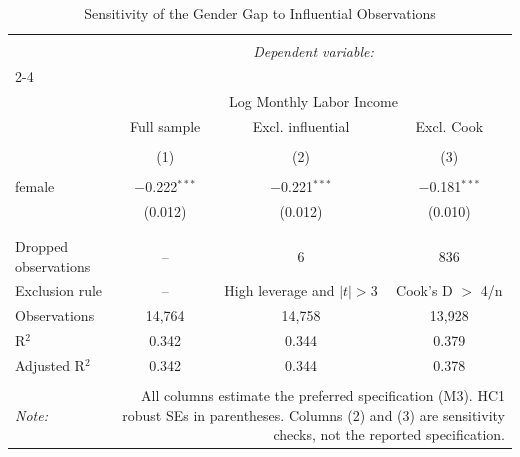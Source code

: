 
\begin{table}[!htbp] \centering 
  \caption{Sensitivity of the Gender Gap to Influential Observations} 
  \label{tab:gender_gap_robustness} 
\begin{tabular}{@{\extracolsep{5pt}}lccc} 
\\[-1.8ex]\hline 
\hline \\[-1.8ex] 
 & \multicolumn{3}{c}{\textit{Dependent variable:}} \\ 
\cline{2-4} 
\\[-1.8ex] & \multicolumn{3}{c}{Log Monthly Labor Income} \\ 
 & Full sample & Excl. influential & Excl. Cook \\ 
\\[-1.8ex] & (1) & (2) & (3)\\ 
\hline \\[-1.8ex] 
 female & $-$0.222$^{***}$ & $-$0.221$^{***}$ & $-$0.181$^{***}$ \\ 
  & (0.012) & (0.012) & (0.010) \\ 
  & & & \\ 
\hline \\[-1.8ex] 
Dropped observations & -- & 6 & 836 \\ 
Exclusion rule & -- & High leverage and $|t| > 3$ & Cook's D $>$ 4/n \\ 
Observations & 14,764 & 14,758 & 13,928 \\ 
R$^{2}$ & 0.342 & 0.344 & 0.379 \\ 
Adjusted R$^{2}$ & 0.342 & 0.344 & 0.378 \\ 
\hline 
\hline \\[-1.8ex] 
\textit{Note:}  & \multicolumn{3}{r}{All columns estimate the preferred specification (M3). HC1 robust SEs in parentheses. Columns (2) and (3) are sensitivity checks, not the reported specification.} \\ 
\end{tabular} 
\end{table} 
